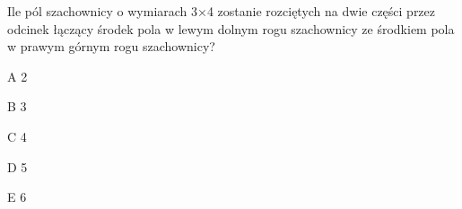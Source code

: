 \begin{tresc}
Ile pól szachownicy o wymiarach 3×4 zostanie rozciętych na dwie części przez odcinek łączący środek pola w lewym dolnym rogu szachownicy ze środkiem pola w prawym górnym rogu szachownicy?
\end{tresc}
\begin{wariant}{A} 2 \end{wariant}
\begin{wariant}{B} 3 \end{wariant}
\begin{wariant}{C} 4 \end{wariant}
\begin{wariant}{D} 5 \end{wariant}
\begin{wariant}{E} 6 \end{wariant}
